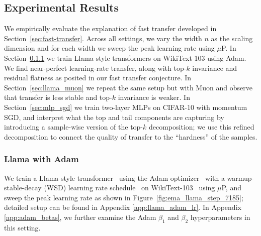 \subsection{Experimental Results}\label{sec:tf_experiments}
We empirically evaluate the explanation of fast transfer developed in Section~\ref{sec:fast-transfer}. Across all settings, we vary the width $n$ as the scaling dimension and for each width we sweep the peak learning rate using $\mu$P. In Section~\ref{sec:llama_adam} we train Llama-style transformers on WikiText-103 using Adam. We find near-perfect learning-rate transfer, along with top-$k$ invariance and residual flatness as posited in our fast transfer conjecture. In Section~\ref{sec:llama_muon} we repeat the same setup but with Muon and observe that transfer is less stable and top-$k$ invariance is weaker. In Section~\ref{sec:mlp_sgd} we train two-layer MLPs on CIFAR-10 with momentum SGD, and interpret what the top and tail components are capturing by introducing a sample-wise version of the top-$k$ decomposition; we use this refined decomposition to connect the quality of transfer to the ``hardness'' of the samples.  



\subsubsection{Llama with Adam}\label{sec:llama_adam}
We train a Llama-style transformer~\citep{touvron2023llama} using the Adam optimizer~\citep{kingma2014adam} with a warmup-stable-decay (WSD) learning rate schedule~\citep{hu2024minicpm} on WikiText-103~\citep{merity2016pointer} using $\mu$P, and sweep the peak learning rate as shown in Figure~\ref{fig:ema_llama_step_7185}; 
detailed setup can be found in Appendix \ref{app:llama_adam_lr}. 
In Appendix \ref{app:adam_betas}, we further examine the Adam $\beta_1$ and $\beta_2$ hyperparameters in this setting.

